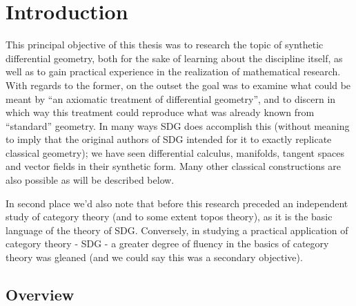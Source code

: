 \chapter{Introduction}

This principal objective of this thesis was to research the topic of synthetic differential geometry, both for the sake of learning about the discipline itself, as well as to gain practical experience in the realization of mathematical research. With regards to the former, on the outset the goal was to examine what could be meant by ``an axiomatic treatment of differential geometry'', and to discern in which way this treatment could reproduce what was already known from ``standard'' geometry. In many ways SDG does accomplish this (without meaning to imply that the original authors of SDG intended for it to exactly replicate classical geometry); we have seen differential calculus, manifolds, tangent spaces and vector fields in their synthetic form. Many other classical constructions are also possible as will be described below.

In second place we'd also note that before this research preceded an independent study of category theory (and to some extent topos theory), as it is the basic language of the theory of SDG. Conversely, in studying a practical application of category theory - SDG - a greater degree of fluency in the basics of category theory was gleaned (and we could say this was a secondary objective).

\section{Overview}

